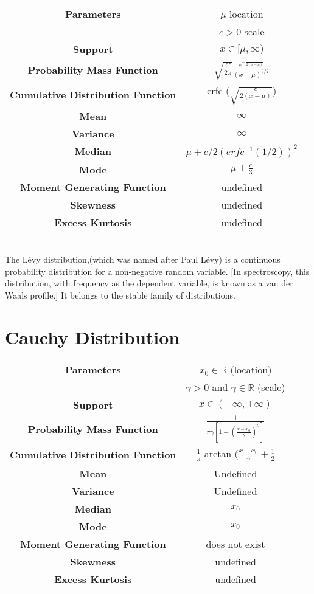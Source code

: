 \documentclass[14pt, a4paper]{article}
\theoremstyle{definition}
\newcommand{\R}{\mathbb{R}}
\begin{document}
\begin{tabular}{|c|c|}  %
\hline
 \textbf{Parameters }& $\mu$ location \\ & $c > 0$ scale \\
 \hline
 \textbf{Support} & $ x \in [ \mu, \infty )$ \\
 \hline
 \textbf{Probability Mass Function} & $\sqrt{\frac{C}{2\pi}} \frac{e^{- \frac{e}{2(x - \mu)} }}{(x-\mu)^{3/2}}$ \\
 \hline
 \textbf{Cumulative Distribution Function} &  erfc $\Bigg( \sqrt{\frac{c}{2(x - \mu)}} \Bigg)$\\
 \hline
 \textbf{Mean} & $\infty$ \\ 
 \hline
 \textbf{Variance} & $\infty$ \\
 \hline
 \textbf{Median} & $\mu + c/2(erfc^{-1} (1/2))^2$ \\ 
 \hline
 \textbf{Mode} & $\mu + \frac{c}{3}$ \\
 \hline
 \textbf{Moment Generating Function} & undefined \\
 \hline
 \textbf{Skewness} & undefined\\
 \hline
 \textbf{Excess Kurtosis} & undefined \\
 \hline
       
  \end{tabular}
\\ The Lévy distribution,(which was named after Paul Lévy) is a continuous probability distribution for a non-negative random variable. [In spectroscopy, this distribution, with frequency as the dependent variable, is known as a van der Waals profile.] It belongs to the stable family of distributions. 
  
\section{Cauchy Distribution}


\begin{tabular}{|c|c|}  %
\hline
 \textbf{Parameters }& $x_0 \in \R$ (location) \\ & $\gamma > 0 $ and $\gamma \in \R$ (scale) \\
 \hline
 \textbf{Support} & $x \in (- \infty , + \infty)$ \\
 \hline
 \textbf{Probability Mass Function} &  $\frac{1}{\pi \gamma [1 + (\frac{x-x_0}{\gamma})^2 ]}$\\
 \hline
 \textbf{Cumulative Distribution Function} &  $\frac{1}{\pi}$ arctan $\Big( \frac{x - x_0}{\gamma} + \frac{1}{2}$\\
 \hline
 \textbf{Mean} & Undefined \\ 
 \hline
 \textbf{Variance} & Undefined \\
 \hline
 \textbf{Median} & $x_0$ \\ 
 \hline
 \textbf{Mode} & $x_0$ \\
 \hline
 \textbf{Moment Generating Function} & does not exist\\
 \hline
 \textbf{Skewness} & undefined\\
 \hline
 \textbf{Excess Kurtosis} & undefined \\
 \hline
       
  \end{tabular}
  
\end{document}
